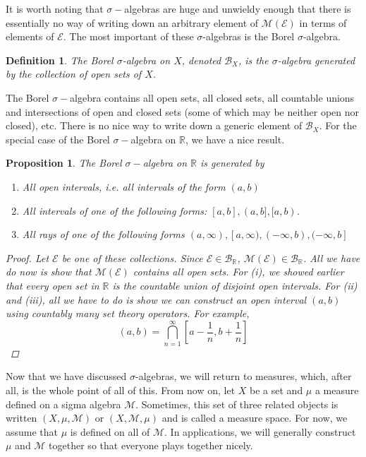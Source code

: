 \documentclass[10pt]{article}         %
\newtheorem{definition}{Definition}[section]
\newtheorem{proposition}{Proposition}[section]
\theoremstyle{remark}
\newcommand{\R}{\mathbb{R}}
\begin{document}
It is worth noting that $\sigma-$algebras are huge and unwieldy enough that there is essentially no way of writing down an arbitrary element of $\mathcal{M}(\mathcal{E})$ in terms of elements of $\mathcal{E}$. The most important of these $\sigma$-algebras is the Borel $\sigma$-algebra.

\begin{definition}
The \emph{Borel $\sigma$-algebra} on $X$, denoted $\mathcal{B}_X$, is the $\sigma$-algebra generated by the collection of open sets of $X$.
\end{definition}

The Borel $\sigma-$algebra contains all open sets, all closed sets, all countable unions and intersections of open and closed sets (some of which may be neither open nor closed), etc. There is no nice way to write down a generic element of $\mathcal{B}_X$. For the special case of the Borel $\sigma-$algebra on $\R$, we have a nice result.

\begin{proposition}The Borel $\sigma-$algebra on $\R$ is generated by 
\begin{enumerate}
	\item All open intervals, i.e. all intervals of the form $(a, b)$
	\item All intervals of one of the following forms: $[a, b], (a, b], [a, b)$.
	\item All rays of one of the following forms $(a, \infty), [a, \infty), (-\infty, b), (-\infty, b]$
\end{enumerate}
\begin{proof}
Let $\mathcal{E}$ be one of these collections. Since $\mathcal{E} \in \mathcal{B}_\R$, $\mathcal{M}(\mathcal{E}) \in \mathcal{B}_\R$. All we have do now is show that $\mathcal{M}(\mathcal{E})$ contains all open sets. For (i), we showed earlier that every open set in $\R$ is the countable union of disjoint open intervals. For (ii) and (iii), all we have to do is show we can construct an open interval $(a, b)$ using countably many set theory operators. For example,
\[
(a, b) = \bigcap_{n=1}^\infty \left[ a - \frac{1}{n}, b + \frac{1}{n}  \right]
\]
\end{proof}
\end{proposition}

Now that we have discussed $\sigma$-algebras, we will return to measures, which, after all, is the whole point of all of this. From now on, let $X$ be a set and $\mu$ a measure defined on a sigma algebra $\mathcal{M}$. Sometimes, this set of three related objects is written $(X, \mu, \mathcal{M})$ or $(X, \mathcal{M}, \mu)$ and is called a measure space. For now, we assume that $\mu$ is defined on all of $\mathcal{M}$. In applications, we will generally construct $\mu$ and $\mathcal{M}$ together so that everyone plays together nicely.
\end{document}
